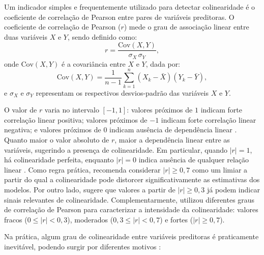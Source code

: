 Um indicador simples e frequentemente utilizado para detectar colinearidade é o coeficiente de correlação de Pearson entre pares de variáveis preditoras. O coeficiente de correlação de Pearson ($r$) mede o grau de associação linear entre duas variáveis $X$ e $Y$, sendo definido como:
\begin{equation}
	r = \frac{\text{Cov}(X,Y)}{\sigma_X \, \sigma_Y},
\end{equation}
onde $\text{Cov}(X,Y)$ é a covariância entre $X$ e $Y$, dada por:
\begin{equation}
	\text{Cov}(X,Y) = \frac{1}{n-1} \sum_{k=1}^{n} (X_k - \bar{X})(Y_k - \bar{Y}),
\end{equation}
e $\sigma_X$ e $\sigma_Y$ representam os respectivos desvios-padrão das variáveis $X$ e $Y$.

O valor de $r$ varia no intervalo $[-1,1]$: valores próximos de $1$ indicam forte correlação linear positiva; valores próximos de $-1$ indicam forte correlação linear negativa; e valores próximos de $0$ indicam ausência de dependência linear \cite{PearsonCorrelationCoefficient}. Quanto maior o valor absoluto de $r$, maior a dependência linear entre as variáveis, sugerindo a presença de colinearidade. Em particular, quando $|r| = 1$, há colinearidade perfeita, enquanto $|r| = 0$ indica ausência de qualquer relação linear \cite{kim2019multicollinearity}. Como regra prática,  recomenda considerar $|r| \geq 0{,}7$ como um limiar a partir do qual a colinearidade pode distorcer significativamente as estimativas dos modelos. Por outro lado,  sugere que valores a partir de $|r| \geq 0{,}3$ já podem indicar sinais relevantes de colinearidade. Complementarmente,  utilizou diferentes graus de correlação de Pearson para caracterizar a intensidade da colinearidade: valores fracos (\(0 \leq |r| < 0,3\)), moderados (\(0,3 \leq |r| < 0,7\)) e fortes (\(|r| \geq 0,7\)).

Na prática, algum grau de colinearidade entre variáveis preditoras é praticamente inevitável, podendo surgir por diferentes motivos \cite{Carsten2012Collinearity}:

